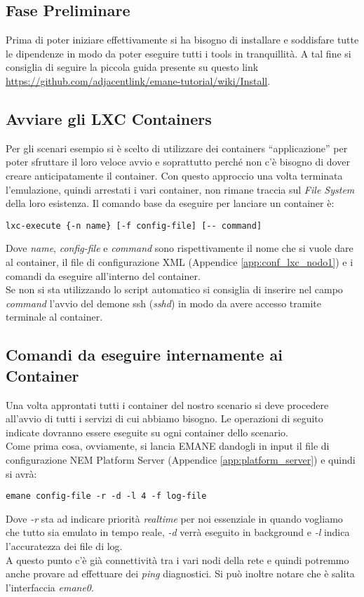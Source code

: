\subsection{Fase Preliminare}

Prima di poter iniziare effettivamente si ha bisogno di installare e soddisfare tutte le dipendenze in modo da poter eseguire tutti i tools in tranquillità. A tal fine si consiglia di seguire la piccola guida presente su questo link \url{https://github.com/adjacentlink/emane-tutorial/wiki/Install}.

\subsection{Avviare gli LXC Containers}

Per gli scenari esempio si è scelto di utilizzare dei containers ``applicazione'' per poter sfruttare il loro veloce avvio e soprattutto perché non c'è bisogno di dover creare anticipatamente il container. Con questo approccio una volta terminata l'emulazione, quindi arrestati i vari container, non rimane traccia sul \textit{File System} della loro esistenza. Il comando base da eseguire per lanciare un container è:
\begin{verbatim}
lxc-execute {-n name} [-f config-file] [-- command]
\end{verbatim}
\noindent
Dove \textit{name}, \textit{config-file} e \textit{command} sono rispettivamente il nome che si vuole dare al container, il file di configurazione XML (Appendice \ref{app:conf_lxc_nodo1}) e i comandi da eseguire all'interno del container. \\
Se non si sta utilizzando lo script automatico si consiglia di inserire nel campo \textit{command} l'avvio del demone ssh (\textit{sshd}) in modo da avere accesso tramite terminale al container.

\subsection{Comandi da eseguire internamente ai Container}

Una volta approntati tutti i container del nostro scenario si deve procedere all'avvio di tutti i servizi di cui abbiamo bisogno. Le operazioni di seguito indicate dovranno essere eseguite su ogni container dello scenario. \\

Come prima cosa, ovviamente, si lancia EMANE dandogli in input il file di configurazione NEM Platform Server (Appendice \ref{app:platform_server}) e quindi si avrà:
\begin{verbatim}
emane config-file -r -d -l 4 -f log-file
\end{verbatim}
\noindent
Dove \textit{-r} sta ad indicare priorità \textit{realtime} per noi essenziale in quando vogliamo che tutto sia emulato in tempo reale, \textit{-d} verrà eseguito in background e \textit{-l} indica l'accuratezza dei file di log. \\
A questo punto c'è già connettività tra i vari nodi della rete e quindi potremmo anche provare ad effettuare dei \textit{ping} diagnostici. Si può inoltre notare che è salita l'interfaccia \textit{emane0}.

